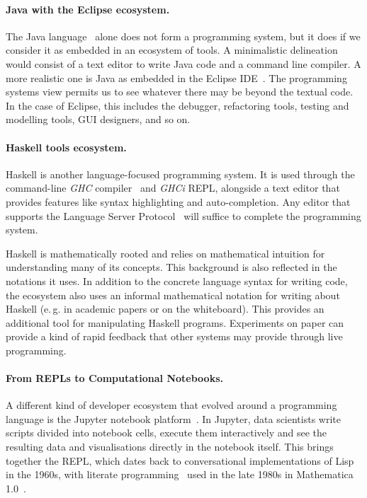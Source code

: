 \documentclass[ twoside,openright,titlepage,numbers=noenddot,headinclude,footinclude,cleardoublepage=empty,abstract=on,
                BCOR=5mm,paper=a4,fontsize=11pt
                ]{scrreprt}
\newcommand{\eg}{e.\,g.}
\theoremstyle{definition}
\begin{document}
\paragraph{Java with the Eclipse ecosystem.}

The Java language~\parencite{Java} alone does not form a programming
system, but it does if we consider it as embedded in an ecosystem of
tools. A minimalistic delineation would consist of a text editor to
write Java code and a command line compiler. A more realistic one is
Java as embedded in the Eclipse \ac{IDE}~\parencite{Eclipse}. The
programming systems view permits us to see whatever there may be beyond
the textual code. In the case of Eclipse, this includes the debugger,
refactoring tools, testing and modelling tools, \ac{GUI} designers, and
so on.

\paragraph{Haskell tools ecosystem.}

Haskell is another language-focused programming system. It is used
through the command-line \emph{GHC} compiler~\parencite{GHC} and
\emph{GHCi} REPL, alongside a text editor that provides features like
syntax highlighting and auto-completion. Any editor that supports the
Language Server Protocol~\parencite{LSP} will suffice to complete the
programming system.

Haskell is mathematically rooted and relies on mathematical intuition
for understanding many of its concepts. This background is also
reflected in the notations it uses. In addition to the concrete language
syntax for writing code, the ecosystem also uses an informal
mathematical notation for writing about Haskell (\eg{} in academic
papers or on the whiteboard). This provides an additional tool for
manipulating Haskell programs. Experiments on paper can provide a kind
of rapid feedback that other systems may provide through live
programming.

\paragraph{From REPLs to Computational Notebooks.}

A different kind of developer ecosystem that evolved around a
programming language is the Jupyter notebook
platform~\parencite{Jupyter}. In Jupyter, data scientists write scripts
divided into notebook cells, execute them interactively and see the
resulting data and visualisations directly in the notebook itself. This
brings together the \ac{REPL}, which dates back to conversational
implementations of Lisp in the 1960s, with literate
programming~\parencite{LiterateProg} used in the late 1980s in
Mathematica 1.0~\parencite{Mathematica}.
\end{document}
